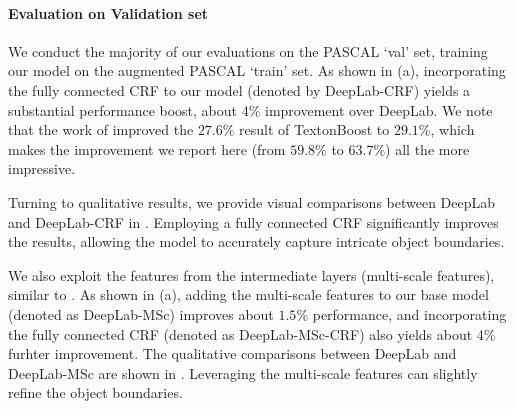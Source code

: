 \paragraph{Evaluation on Validation set} We conduct the majority of
our evaluations on the PASCAL `val' set, training our model on the
augmented PASCAL `train' set. As shown in  (a),
incorporating the fully connected CRF to our model (denoted by
DeepLab-CRF) yields a substantial performance boost, about 4\%
improvement over DeepLab. We note that the work of
\citet{krahenbuhl2011efficient} improved the $27.6\%$ result of
TextonBoost \citep{shotton2009textonboost} to $29.1\%$, which makes
the  improvement we report here (from $59.8\%$ to $63.7\%$) all the
more impressive.

Turning to qualitative results, we provide visual comparisons between
DeepLab and DeepLab-CRF in . Employing a fully
connected CRF significantly improves the results, allowing the model
to accurately capture intricate object boundaries.

We also exploit the features from the intermediate layers (\ie multi-scale features), similar to \citet{hariharan2014hypercolumns, long2014fully}. As shown in  (a), adding the multi-scale features to our base model (denoted as DeepLab-MSc) improves about $1.5\%$ performance, and incorporating the fully connected CRF (denoted as DeepLab-MSc-CRF) also yields about 4\% furhter improvement. The qualitative comparisons between DeepLab and DeepLab-MSc are shown in . Leveraging the multi-scale features can slightly refine the object boundaries.

